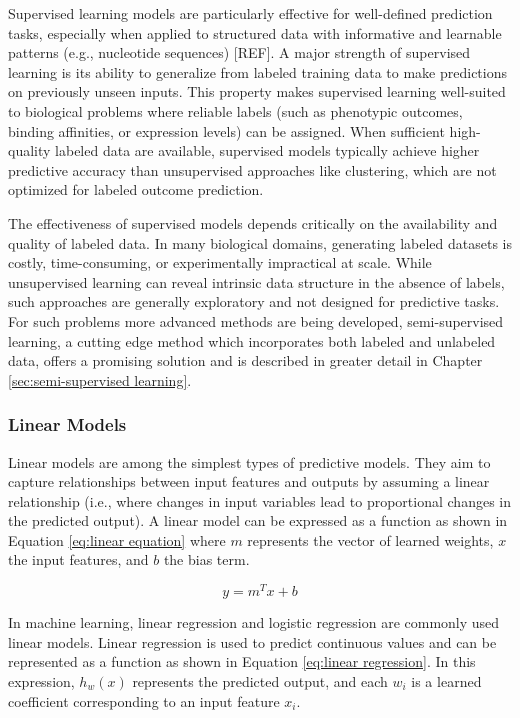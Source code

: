 \documentclass{report}
\begin{document}
Supervised learning models are particularly effective for well-defined prediction tasks, especially when applied to structured data with informative and learnable patterns (e.g., nucleotide sequences) [REF]. A major strength of supervised learning is its ability to generalize from labeled training data to make predictions on previously unseen inputs. This property makes supervised learning well-suited to biological problems where reliable labels (such as phenotypic outcomes, binding affinities, or expression levels) can be assigned. When sufficient high-quality labeled data are available, supervised models typically achieve higher predictive accuracy than unsupervised approaches like clustering, which are not optimized for labeled outcome prediction.

The effectiveness of supervised models depends critically on the availability and quality of labeled data. In many biological domains, generating labeled datasets is costly, time-consuming, or experimentally impractical at scale. While unsupervised learning can reveal intrinsic data structure in the absence of labels, such approaches are generally exploratory and not designed for predictive tasks. For such problems more advanced methods are being developed, semi-supervised learning, a cutting edge method which incorporates both labeled and unlabeled data, offers a promising solution and is described in greater detail in Chapter \ref{sec:semi-supervised learning}.

\subsubsection{Linear Models}

Linear models are among the simplest types of predictive models. They aim to capture relationships between input features and outputs by assuming a linear relationship (i.e., where changes in input variables lead to proportional changes in the predicted output). A linear model can be expressed as a function as shown in Equation \ref{eq:linear equation} where $m$ represents the vector of learned weights, $x$ the input features, and $b$ the bias term.

\begin{equation} \label{eq:linear equation}
y=m^Tx+b
\end{equation}

In machine learning, linear regression and logistic regression are commonly used linear models. Linear regression is used to predict continuous values and can be represented as a function as shown in Equation \ref{eq:linear regression}. In this expression, $h_w(x)$ represents the predicted output, and each $w_i$ is a learned coefficient corresponding to an input feature $x_i$.
\end{document}
